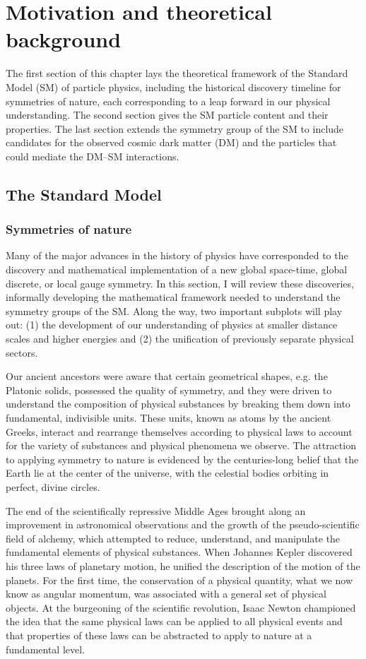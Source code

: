 \chapter{Motivation and theoretical background}

The first section of this chapter lays the theoretical framework of the Standard Model (SM) of particle physics, including the historical discovery timeline for symmetries of nature, each corresponding to a leap forward in our physical understanding. The second section gives the SM particle content and their properties. The last section extends the symmetry group of the SM to include candidates for the observed cosmic dark matter (DM) and the particles that could mediate the DM--SM interactions.

\section{The Standard Model}

\subsection{Symmetries of nature}

Many of the major advances in the history of physics have corresponded to the discovery and mathematical implementation of a new global space-time, global discrete, or local gauge symmetry. In this section, I will review these discoveries, informally developing the mathematical framework needed to understand the symmetry groups of the SM. Along the way, two important subplots will play out: (1) the development of our understanding of physics at smaller distance scales and higher energies and (2) the unification of previously separate physical sectors.

\indent Our ancient ancestors were aware that certain geometrical shapes, e.g. the Platonic solids, possessed the quality of symmetry, and they were driven to understand the composition of physical substances by breaking them down into fundamental, indivisible units. These units, known as atoms by the ancient Greeks, interact and rearrange themselves according to physical laws to account for the variety of substances and physical phenomena we observe. The attraction to applying symmetry to nature is evidenced by the centuries-long belief that the Earth lie at the center of the universe, with the celestial bodies orbiting in perfect, divine circles.

\indent The end of the scientifically repressive Middle Ages brought along an improvement in astronomical observations and the growth of the pseudo-scientific field of alchemy, which attempted to reduce, understand, and manipulate the fundamental elements of physical substances. When Johannes Kepler discovered his three laws of planetary motion, he unified the description of the motion of the planets. For the first time, the conservation of a physical quantity, what we now know as angular momentum, was associated with a general set of physical objects. At the burgeoning of the scientific revolution, Isaac Newton championed the idea that the same physical laws can be applied to all physical events and that properties of these laws can be abstracted to apply to nature at a fundamental level.


